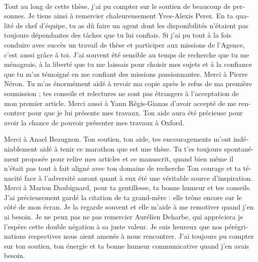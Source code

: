 \begin{otherlanguage}{french}
  \paragraph{}
  Tout au long de cette thèse, j’ai pu compter sur le soutien de beaucoup de
  personnes.  Je tiens ainsi à remercier chaleureusement Yves-Alexis Perez. En
  ta qualité de chef d’équipe, tu as dû faire un agent dont les disponibilités
  n’étaient pas toujours dépendantes des tâches que tu lui confiais. Si j’ai pu
  tout à la fois conduire avec succès un travail de thèse et participer aux
  missions de l’Agence, c’est aussi grâce à toi. J’ai souvent été sensible au
  temps de recherche que tu me ménageais, à la liberté que tu me laissais pour
  choisir mes sujets et à la confiance que tu m’as témoigné en me confiant des
  missions passionnantes.
  Merci à Pierre Néron. Tu m’as énormément aidé à revoir ma copie après
  le refus de ma première soumission ; tes conseils et relectures ne sont pas
  étrangers à l’acceptation de mon premier article.
  Merci aussi à Yann Régis-Gianas d’avoir accepté de me rencontrer pour que je
  lui présente mes travaux. Ton aide aura été précieuse pour avoir la chance de
  pouvoir présenter mes travaux à Oxford.

  Merci à Anael Beaugnon. Ton soutien, ton aide, tes encouragements m’ont
  indéniablement aidé à tenir ce marathon que est une thèse. Tu t’es toujours
  spontanément proposée pour relire mes articles et ce manuscrit, quand bien
  même il n’était pas tout à fait aligné avec ton domaine de recherche Ton
  courage et ta ténacité face à l’adversité auront quant à eux été une véritable
  source d’inspiration.
  Merci à Marion Daubignard, pour ta gentillesse, ta bonne humeur et tes
  conseils. J’ai précieusement gardé la citation de ta grand-mère : elle trône
  encore sur le côté de mon écran. Je la regarde souvent et elle m’aide à me
  remotiver quand j’en ai besoin.
  Je ne peux pas ne pas remercier Aurélien Deharbe, qui appréciera je l’espère
  cette double négation à sa juste valeur. Je suis heureux que nos
  pérégrinations respectives nous aient amenés à nous rencontrer. J’ai toujours
  pu compter sur ton soutien, ton énergie et ta bonne humeur communicative quand
  j’en avais besoin.


\end{otherlanguage}
